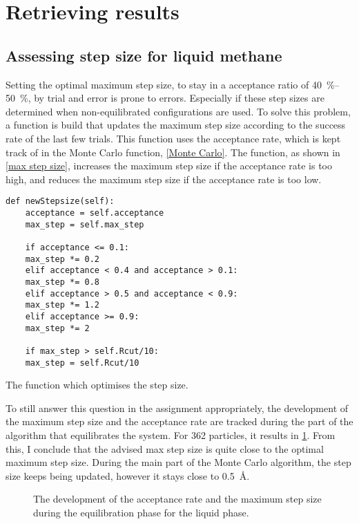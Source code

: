 \section{Retrieving results}
\subsection{Assessing step size for liquid methane}
Setting the optimal maximum step size, to stay in a acceptance ratio of \SIrange{40}{50}{\percent}, by trial and error is prone to errors. Especially if these step sizes are determined when non-equilibrated configurations are used. To solve this problem, a function is build that updates the maximum step size according to the success rate of the last few trials. This function uses the acceptance rate, which is kept track of in the Monte Carlo function, \cref{Monte Carlo}. The function, as shown in \cref{max step size}, increases the maximum step size if the acceptance rate is too high, and reduces the maximum step size if the acceptance rate is too low.

\begin{listing}[ht!]
	\begin{verbatim}
def newStepsize(self):
	acceptance = self.acceptance
	max_step = self.max_step

	if acceptance <= 0.1:
	max_step *= 0.2
	elif acceptance < 0.4 and acceptance > 0.1:
	max_step *= 0.8
	elif acceptance > 0.5 and acceptance < 0.9:
	max_step *= 1.2
	elif acceptance >= 0.9:
	max_step *= 2
	
	if max_step > self.Rcut/10:
	max_step = self.Rcut/10
	\end{verbatim}
\caption{The function which optimises the step size.}
	\label{max step size}
\end{listing}

To still answer this question in the assignment appropriately, the development of the maximum step size and the acceptance rate are tracked during the part of the algorithm that equilibrates the system. For 362 particles, it results in \cref{fig:EquilibratingLiquid}. From this, I conclude that the advised max step size is quite close to the optimal maximum step size. During the main part of the Monte Carlo algorithm, the step size keeps being updated, however it stays close to \SI{0.5}{\angstrom}.

\begin{figure}[th!]
	\centering
	\small
	\def\svgwidth{0.95\columnwidth}
	
	\caption{The development of the acceptance rate and the maximum step size during the equilibration phase for the liquid phase.} 
	\label{fig:EquilibratingLiquid}
\end{figure}

